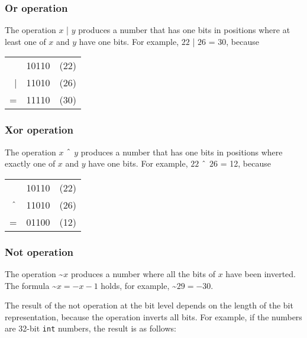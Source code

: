\subsubsection{Or operation}


The  operation $x$ | $y$ produces a number
that has one bits in positions where at least one
of $x$ and $y$ have one bits.
For example, $22$ | $26$ = 30, because

\begin{center}
\begin{tabular}{rrr}
& 10110 & (22)\\
| & 11010 & (26) \\
\hline
 = & 11110 & (30) \\
\end{tabular}
\end{center}

\subsubsection{Xor operation}


The  operation $x$ $\XOR$ $y$ produces a number
that has one bits in positions where exactly one
of $x$ and $y$ have one bits.
For example, $22$ $\XOR$ $26$ = 12, because

\begin{center}
\begin{tabular}{rrr}
& 10110 & (22)\\
$\XOR$ & 11010 & (26) \\
\hline
 = & 01100 & (12) \\
\end{tabular}
\end{center}

\subsubsection{Not operation}


The  operation \textasciitilde$x$
produces a number where all the bits of $x$
have been inverted.
The formula \textasciitilde$x = -x-1$ holds,
for example, \textasciitilde$29 = -30$.

The result of the not operation at the bit level
depends on the length of the bit representation,
because the operation inverts all bits.
For example, if the numbers are 32-bit
\texttt{int} numbers, the result is as follows:

